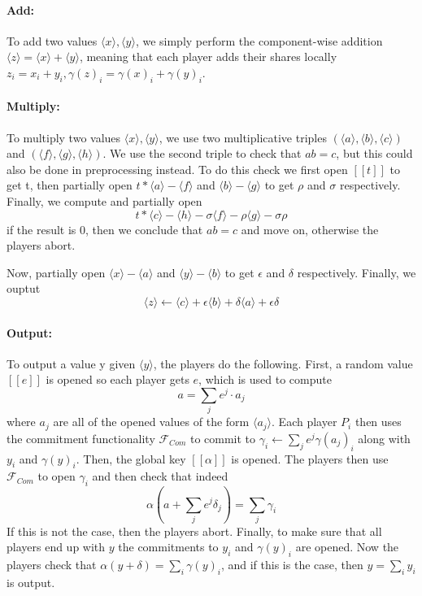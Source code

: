 \documentclass[../main.tex]{subfiles}
\begin{document}
\paragraph{Add:} To add two values $\langle x \rangle, \langle y \rangle$, we simply perform the component-wise addition $\langle z \rangle = \langle x \rangle + \langle y \rangle$, meaning that each player adds their shares locally $z_i = x_i + y_i, \gamma(z)_i = \gamma(x)_i + \gamma(y)_i$. %

\paragraph{Multiply:} To multiply two values $\langle x \rangle, \langle y \rangle$, we use two multiplicative triples $(\langle a \rangle, \langle b \rangle, \langle c \rangle)$ and $(\langle f \rangle, \langle g \rangle, \langle h \rangle)$. We use the second triple to check that $ab = c$, but this could also be done in preprocessing instead. To do this check we first open $[\![ t ]\!]$ to get t, then partially open $t * \langle a \rangle - \langle f \rangle$ and $\langle b \rangle - \langle g \rangle$ to get $\rho$ and $\sigma$ respectively. Finally, we compute and partially open $$t * \langle c \rangle - \langle h \rangle - \sigma \langle f \rangle - \rho \langle g \rangle - \sigma \rho$$
if the result is $0$, then we conclude that $ab = c$ and move on, otherwise the players abort.

Now, partially open $\langle x \rangle - \langle a \rangle$ and $\langle y \rangle - \langle b \rangle$ to get $\epsilon$ and $\delta$ respectively. Finally, we ouptut $$\langle z \rangle \leftarrow \langle c \rangle + \epsilon \langle b \rangle + \delta \langle a \rangle + \epsilon \delta$$

\paragraph{Output:}
To output a value y given $\langle y \rangle$, the players do the following.
First, a random value $[\![ e ]\!]$ is opened so each player gets $e$, which is used to compute $$a = \sum_j e^j \cdot a_j$$ where $a_j$ are all of the opened values of the form $\langle a_j \rangle$.
Each player $P_i$ then uses the commitment functionality $\mathcal{F}_{Com}$ to commit to $\gamma_i \leftarrow \sum_j e^j \gamma(a_j)_i$ along with $y_i$ and $\gamma(y)_i$.
Then, the global key $[\![ \alpha ]\!]$ is opened.
The players then use $\mathcal{F}_{Com}$ to open $\gamma_i$ and then check that indeed $$\alpha(a + \sum_j e^j \delta_j) = \sum_j \gamma_i$$
If this is not the case, then the players abort.
Finally, to make sure that all players end up with $y$ the commitments to $y_i$ and $\gamma(y)_i$ are opened. Now the players check that $\alpha(y + \delta) = \sum_i \gamma(y)_i$, and if this is the case, then $y = \sum_i y_i$ is output.
\end{document}
